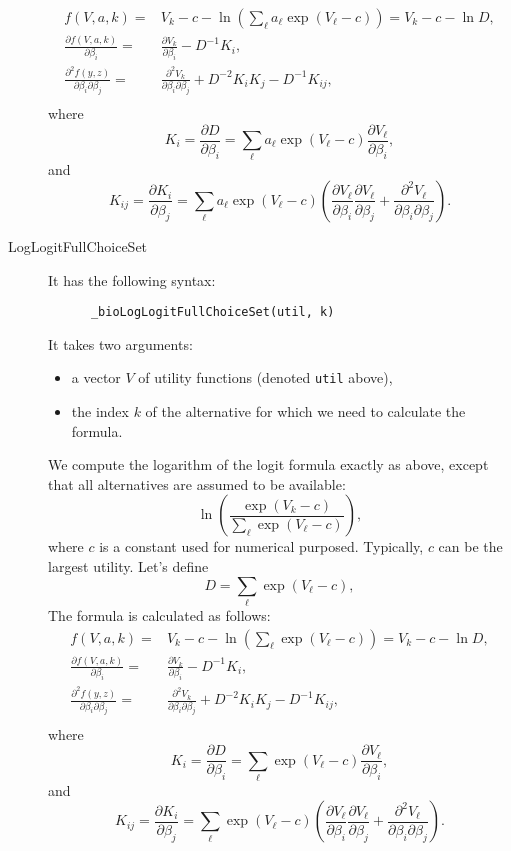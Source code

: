 \documentclass[12pt,a4paper]{article}
\begin{document}
\begin{description}
  \begin{align*}
    f(V, a, k) =& V_k - c -\ln(\sum_\ell a_\ell\exp(V_\ell-c)) = V_k - c-\ln D, \\
    \frac{\partial f(V, a, k)}{\partial \beta_i} =&  \frac{\partial V_k}{\partial \beta_i} - D^{-1} K_i, \\ 
    \frac{\partial^2 f(y, z)}{\partial \beta_i \partial \beta_j} =&
    \frac{\partial^2 V_k}{\partial \beta_i \partial \beta_j} + D^{-2} K_i K_j - D^{-1} K_{ij},\\
  \end{align*}
  where
  \[
K_i = \frac{\partial D}{\partial \beta_i} = \sum_\ell a_\ell\exp(V_\ell-c) \frac{\partial V_\ell}{\partial \beta_i},
\]
and
\[
K_{ij} = \frac{\partial K_i}{\partial \beta_j} = \sum_\ell a_\ell\exp(V_\ell-c) \left(
\frac{\partial V_\ell}{\partial \beta_i} \frac{\partial V_\ell}{\partial \beta_j} +
\frac{\partial^2 V_\ell}{\partial \beta_i \partial \beta_j}
\right).
\]
\item[LogLogitFullChoiceSet] It has the following syntax:
    \begin{lstlisting}
      _bioLogLogitFullChoiceSet(util, k)
  \end{lstlisting}
It takes two arguments:
\begin{itemize}
\item a vector $V$ of utility functions (denoted \verb+util+ above),
\item the index $k$ of the alternative for which we need to calculate the formula.
\end{itemize}
We compute the logarithm of the logit formula exactly as above, except that all alternatives are assumed to be available:
\[
\ln\left(\frac{\exp(V_k-c)}{\sum_\ell \exp(V_\ell -c)}\right),
\]
where $c$ is a constant used for numerical purposed. Typically, $c$ can be the largest utility.
Let's define
\[
D = \sum_{\ell} \exp(V_\ell - c),
\]
The formula is calculated as follows:
  \begin{align*}
    f(V, a, k) =& V_k - c -\ln(\sum_\ell \exp(V_\ell-c)) = V_k - c-\ln D, \\
    \frac{\partial f(V, a, k)}{\partial \beta_i} =&  \frac{\partial V_k}{\partial \beta_i} - D^{-1} K_i, \\ 
    \frac{\partial^2 f(y, z)}{\partial \beta_i \partial \beta_j} =&
    \frac{\partial^2 V_k}{\partial \beta_i \partial \beta_j} + D^{-2} K_i K_j - D^{-1} K_{ij},\\
  \end{align*}
  where
  \[
K_i = \frac{\partial D}{\partial \beta_i} = \sum_\ell \exp(V_\ell-c) \frac{\partial V_\ell}{\partial \beta_i},
\]
and
\[
K_{ij} = \frac{\partial K_i}{\partial \beta_j} = \sum_\ell \exp(V_\ell-c) \left(
\frac{\partial V_\ell}{\partial \beta_i} \frac{\partial V_\ell}{\partial \beta_j} +
\frac{\partial^2 V_\ell}{\partial \beta_i \partial \beta_j}
\right).
\]

\end{description}











\end{document}
